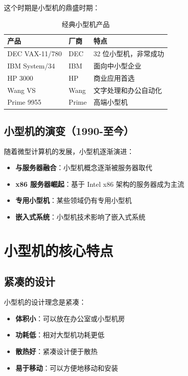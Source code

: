 \documentclass[12pt,UTF8]{ctexbook}
\begin{document}
这个时期是小型机的鼎盛时期：

\begin{table}[htbp]
    \centering
    \caption{经典小型机产品}
    \begin{tabular}{|p{3cm}|p{3cm}|p{4cm}|}
        \hline
        \textbf{产品} & \textbf{厂商} & \textbf{特点} \\
        \hline
        DEC VAX-11/780 & DEC & 32 位小型机，非常成功 \\
        \hline
        IBM System/34 & IBM & 面向中小型企业 \\
        \hline
        HP 3000 & HP & 商业应用首选 \\
        \hline
        Wang VS & Wang & 文字处理和办公自动化 \\
        \hline
        Prime 9955 & Prime & 高端小型机 \\
        \hline
    \end{tabular}
\end{table}

\section{小型机的演变（1990-至今）}

随着微型计算机的发展，小型机逐渐演进：

\begin{itemize}[leftmargin=2cm]
    \item \textbf{与服务器融合}：小型机概念逐渐被服务器取代
    \item \textbf{x86 服务器崛起}：基于 Intel x86 架构的服务器成为主流
    \item \textbf{专用小型机}：某些领域仍有专用小型机
    \item \textbf{嵌入式系统}：小型机技术影响了嵌入式系统
\end{itemize}

\chapter{小型机的核心特点}
\label{chap:features}

\section{紧凑的设计}

小型机的设计理念是紧凑：

\begin{itemize}[leftmargin=2cm]
    \item \textbf{体积小}：可以放在办公室或小型机房
    \item \textbf{功耗低}：相对大型机功耗更低
    \item \textbf{散热好}：紧凑设计便于散热
    \item \textbf{易于移动}：可以方便地移动和安装
\end{itemize}
\end{document}
